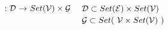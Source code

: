 \documentclass[leqno]{article}
\newcommand{\ky}[1]{{\tt #1}}
\newcommand{\ina}{\hspace*{1em}}
\newcommand{\inb}{\hspace*{2em}}
\newcommand{\inc}{\hspace*{3.5em}}
\newcommand{\func}[1]{\mbox{\sc #1}}
\newcommand{\f}[1]{\func{#1}}
\newcommand{\srt}[1]{{\cal #1}}
\newcommand{\ret}{\mbox{$\ \rightarrow\ $}}
\begin{document}
%

\newpage
\section*{{} $:\srt D\ret Set(\srt V)\times \srt G$
\hfill{\normalsize{
  $\begin{array}[t]{l}\srt D\subset Set(\srt E)\times Set(\srt V)\\[.5ex]
       \srt G \subset Set(\ \srt V\times Set(\srt V)\ )\end{array}$ }} }
\end{document}
